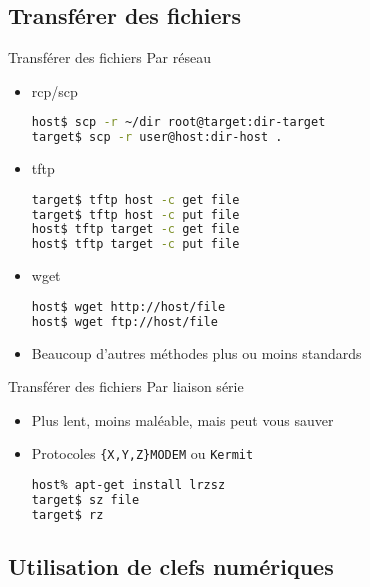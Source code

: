 \subsection{Transférer des fichiers}

\begin{frame}[fragile=singleslide]{Transférer des fichiers}
  Par réseau
  \begin{itemize}
  \item rcp/scp
\begin{lstlisting}[language=sh]
host$ scp -r ~/dir root@target:dir-target
target$ scp -r user@host:dir-host .
\end{lstlisting} %
  \item tftp
\begin{lstlisting}[language=sh]
target$ tftp host -c get file
target$ tftp host -c put file
host$ tftp target -c get file
host$ tftp target -c put file
\end{lstlisting} %
  \item wget
\begin{lstlisting}[language=sh]
host$ wget http://host/file
host$ wget ftp://host/file
\end{lstlisting} %
  \item Beaucoup d'autres méthodes plus ou moins standards
  \end{itemize}
\end{frame}

\begin{frame}[fragile=singleslide]{Transférer des fichiers}
  Par liaison série
  \begin{itemize}
  \item Plus lent, moins maléable, mais peut vous sauver
  \item Protocoles \verb+{X,Y,Z}MODEM+ ou \verb+Kermit+
\begin{lstlisting}[language=sh]
host% apt-get install lrzsz
target$ sz file
target$ rz
\end{lstlisting} %
  \end{itemize}
\end{frame}

\subsection{Utilisation de clefs numériques}


